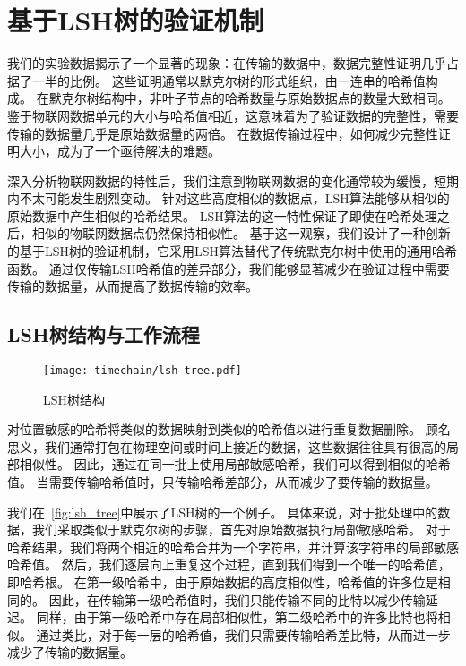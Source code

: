 \chapter{基于LSH树的验证机制}
\label{sec:lsh}
我们的实验数据揭示了一个显著的现象：在传输的数据中，数据完整性证明几乎占据了一半的比例。
这些证明通常以默克尔树的形式组织，由一连串的哈希值构成。
在默克尔树结构中，非叶子节点的哈希数量与原始数据点的数量大致相同。
鉴于物联网数据单元的大小与哈希值相近，这意味着为了验证数据的完整性，需要传输的数据量几乎是原始数据量的两倍。
在数据传输过程中，如何减少完整性证明大小，成为了一个亟待解决的难题。

深入分析物联网数据的特性后，我们注意到物联网数据的变化通常较为缓慢，短期内不太可能发生剧烈变动。
针对这些高度相似的数据点，LSH算法能够从相似的原始数据中产生相似的哈希结果。
LSH算法的这一特性保证了即使在哈希处理之后，相似的物联网数据点仍然保持相似性。
基于这一观察，我们设计了一种创新的基于LSH树的验证机制，它采用LSH算法替代了传统默克尔树中使用的通用哈希函数。
通过仅传输LSH哈希值的差异部分，我们能够显著减少在验证过程中需要传输的数据量，从而提高了数据传输的效率。

\section{LSH树结构与工作流程}

\begin{figure}[t]
    \centering
	\begin{minipage}{0.45\linewidth}
        \centering
        \texttt{[image: timechain/lsh-tree.pdf]}
        \caption{LSH树结构}
        \label{fig:lsh_tree}
	\end{minipage}
\end{figure}

对位置敏感的哈希将类似的数据映射到类似的哈希值以进行重复数据删除。
顾名思义，我们通常打包在物理空间或时间上接近的数据，这些数据往往具有很高的局部相似性。
因此，通过在同一批上使用局部敏感哈希，我们可以得到相似的哈希值。
当需要传输哈希值时，只传输哈希差部分，从而减少了要传输的数据量。

我们在~\autoref{fig:lsh_tree}中展示了LSH树的一个例子。
具体来说，对于批处理中的数据，我们采取类似于默克尔树的步骤，首先对原始数据执行局部敏感哈希。
对于哈希结果，我们将两个相近的哈希合并为一个字符串，并计算该字符串的局部敏感哈希值。
然后，我们逐层向上重复这个过程，直到我们得到一个唯一的哈希值，即哈希根。
在第一级哈希中，由于原始数据的高度相似性，哈希值的许多位是相同的。
因此，在传输第一级哈希值时，我们只能传输不同的比特以减少传输延迟。
同样，由于第一级哈希中存在局部相似性，第二级哈希中的许多比特也将相似。
通过类比，对于每一层的哈希值，我们只需要传输哈希差比特，从而进一步减少了传输的数据量。

